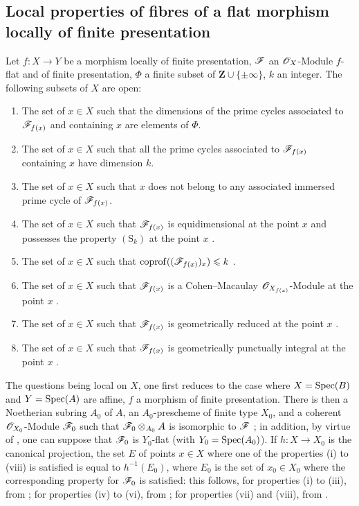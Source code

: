 \subsection{Local properties of fibres of a flat morphism locally of finite presentation}
\label{subsection:IV.12.1}

\begin{theorem}[12.1.1]
\label{IV.12.1.1}
Let $f:X\to Y$ be a morphism locally of finite presentation, $\mathscr{F}$ an $\mathscr{O}_X$-Module $f$-flat and of finite presentation, $\Phi$ a finite subset of $\mathbf{Z}\cup\{\pm\infty\}$, $k$ an integer.
The following subsets of $X$ are open:
\begin{enumerate}[label=(\roman*)]
  \item The set of $x\in X$ such that the dimensions of the prime cycles associated to $\mathscr{F}_{f(x)}$ and containing $x$ are elements of $\Phi$.
  \item The set of $x\in X$ such that all the prime cycles associated to $\mathscr{F}_{f(x)}$ containing $x$ have dimension $k$.
  \item The set of $x\in X$ such that $x$ does not belong to any associated immersed prime cycle of $\mathscr{F}_{f(x)}$.
  \item The set of $x\in X$ such that $\mathscr{F}_{f(x)}$ is equidimensional at the point $x$ and possesses the property $(\mathrm{S}_k)$ at the point $x$ .
  \item The set of $x\in X$ such that $\operatorname{coprof}((\mathscr{F}_{f(x)})_x)\leqslant k$ .
  \item The set of $x\in X$ such that $\mathscr{F}_{f(x)}$ is a Cohen--Macaulay $\mathscr{O}_{X_{f(x)}}$-Module at the point $x$ .
  \item The set of $x\in X$ such that $\mathscr{F}_{f(x)}$ is geometrically reduced at the point $x$ .
  \item The set of $x\in X$ such that $\mathscr{F}_{f(x)}$ is geometrically punctually integral at the point $x$ .
\end{enumerate}

The questions being local on $X$, one first reduces to the case where $X=\operatorname{Spec}(B)$ and $Y=\operatorname{Spec}(A)$ are affine, $f$ a morphism of finite presentation.
There is then a Noetherian subring $A_0$ of $A$, an $A_0$-prescheme of finite type $X_0$, and a coherent $\mathscr{O}_{X_0}$-Module $\mathscr{F}_0$ such that $\mathscr{F}_0\otimes_{A_0}A$ is isomorphic to $\mathscr{F}$ ; in addition, by virtue of , one can suppose that $\mathscr{F}_0$ is $Y_0$-flat (with $Y_0=\operatorname{Spec}(A_0)$).
If $h:X\to X_0$ is the canonical projection, the set $E$ of points $x\in X$ where one of the properties (i) to (viii) is satisfied is equal to $h^{-1}(E_0)$, where $E_0$ is the set of $x_0\in X_0$ where the corresponding property for $\mathscr{F}_0$ is satisfied: this follows, for properties (i) to (iii), from ; for properties (iv) to (vi), from ; for properties (vii) and (viii), from .
\end{theorem}

